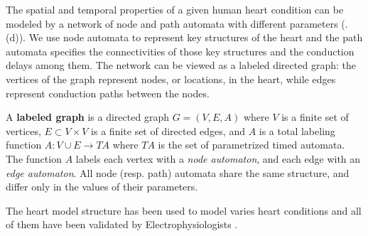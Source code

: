 %
The spatial and temporal properties of a given human heart condition can be modeled by a network of node and path automata with different parameters (.(d)). We use node automata to represent key structures of the heart and the path automata specifies the connectivities of those key structures and the conduction delays among them. The network can be viewed as a labeled directed graph: the vertices of the graph represent nodes, or locations, in the heart, while edges represent conduction paths between the nodes. 
\begin{defn}
	A \textbf{labeled graph} is a directed graph $G = (V,E,A)$ where 
	$V$ is a finite set of vertices, $E \subset V\times V$ is a finite set of directed edges,
	and $A$ is a total labeling function $A: V \cup E \rightarrow TA$
	where $TA$ is the set of parametrized timed automata.
	The function $A$ labels each vertex with a \emph{node automaton}, and each edge with an \emph{edge automaton}.
	All node (resp. path) automata share the same structure, and differ only in the values of their parameters.
\end{defn}
The heart model structure has been used to model varies heart conditions and all of them have been validated by Electrophysiologists \cite{vhm_ecrts10,vhm_embc10}.

